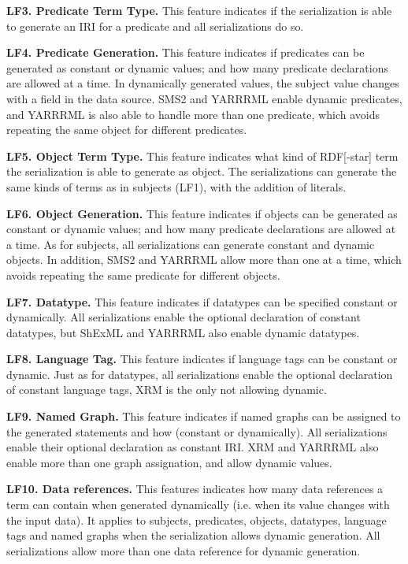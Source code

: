 \textbf{LF3. Predicate Term Type.} 
This feature indicates if the serialization is able to generate an IRI for a predicate and all serializations do so.

\textbf{LF4. Predicate Generation.}
This feature indicates if predicates can be generated as constant or dynamic values; and how many predicate declarations are allowed at a time. In dynamically generated values, the subject value changes with a field in the data source. 
SMS2 and YARRRML enable dynamic predicates, and YARRRML is also able to handle more than one predicate, which avoids repeating the same object for different predicates.

\textbf{LF5. Object Term Type.} 
This feature indicates what kind of RDF[-star] term the serialization is able to generate as object. The serializations can generate the same kinds of terms as in subjects (LF1), with the addition of literals. 

\textbf{LF6. Object Generation.}
This feature indicates if objects can be generated as constant or dynamic values; and how many predicate declarations are allowed at a time.
As for subjects, all serializations can generate constant and dynamic objects. In addition, SMS2 and YARRRML allow more than one at a time, which avoids repeating the same predicate for different objects.

\textbf{LF7. Datatype.}
This feature indicates if datatypes can be specified constant or dynamically.
All serializations enable the optional declaration of constant datatypes, but ShExML and YARRRML also enable dynamic datatypes.

\textbf{LF8. Language Tag.}
This feature indicates if language tags can be constant or dynamic. Just as for datatypes, all serializations enable the optional declaration of constant language tags, XRM is the only not allowing dynamic.

\textbf{LF9. Named Graph.} 
This feature indicates if named graphs can be assigned to the generated statements and how (constant or dynamically). 
All serializations enable their optional declaration as constant IRI. XRM and YARRRML also enable more than one graph assignation, and allow dynamic values. 

\textbf{LF10. Data references.} 
This features indicates how many data references a term can contain when generated dynamically (i.e. when its value changes with the input data). It applies to subjects, predicates, objects, datatypes, language tags and named graphs when the serialization allows dynamic generation. All serializations allow more than one data reference for dynamic generation.

